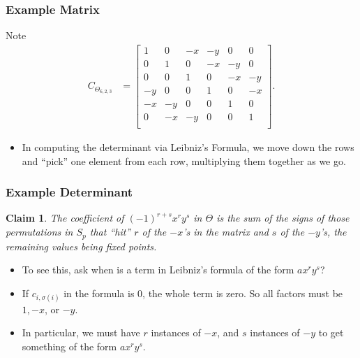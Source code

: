 \documentclass{beamer}
\theoremstyle{plain}
\newtheorem*{Claim}{Claim}
\theoremstyle{definition}
\theoremstyle{remark}
\newcommand{\bee}{\begin{equation}\begin{aligned}}
\newcommand{\eee}{\end{aligned}\end{equation}}
\renewcommand{\'}{\hspace{0.5mm}'}		%
\begin{document}

\begin{frame}
\frametitle{Example Matrix}

Note
\bee
C_{\Theta_{6,2,3}}
&=
\left[
\begin{array}{cccccc}
1 & 0 & -x & -y & 0 & 0\\
0 & 1 & 0 & -x & -y & 0\\
0 & 0 & 1 & 0 & -x & -y\\
-y & 0 & 0 & 1 & 0 & -x\\
-x & -y & 0 & 0 & 1 & 0\\
0 & -x & -y & 0 & 0 & 1\\
\end{array} \right]. 
\eee

\begin{itemize}
	\item In computing the determinant via Leibniz's Formula, 
	we move down the rows and ``pick'' one element from
	each row, multiplying them together as we go. 
\end{itemize}

\end{frame}


\begin{frame}
\frametitle{Example Determinant}

\begin{Claim}
	The coefficient of $(-1)^{r + s}x^ry^s$ in $\Theta$
	is the sum of the signs of those permutations in 
	$S_p$ that ``hit'' $r$ of the $-x$'s in the matrix
	and $s$ of the $-y$'s, the remaining values being
	fixed points. 
\end{Claim}
\begin{itemize}
	\item To see this, ask when is a term in Leibniz's
	formula of the form $ax^ry^s$?
	\item If $c_{i,\sigma(i)}$ in the formula is $0$, 
	the whole term is zero. So all factors must be
	$1,-x$, or $-y$. 
	\item In particular, we must have $r$ instances of 
	$-x$, and $s$ instances of $-y$ to get something of the
	form $ax^ry^s$. 
\end{itemize}

\end{frame}

\end{document}
